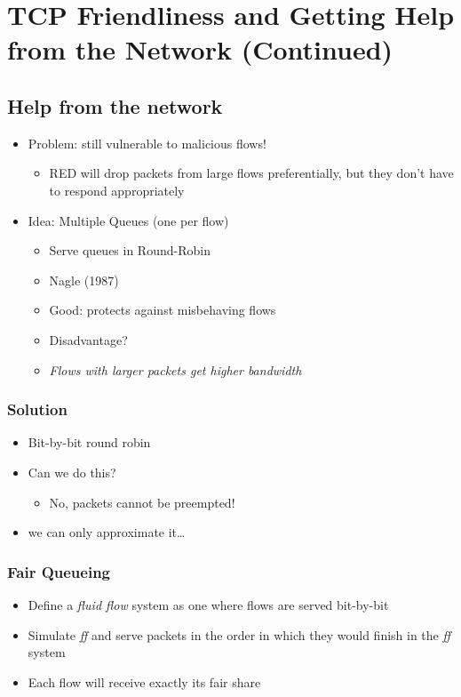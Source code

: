 \chapter{TCP Friendliness and Getting Help from the Network (Continued)}
\section{Help from the network}
\begin{itemize}[nosep]
    \item Problem: still vulnerable to malicious flows!
          \begin{itemize}[nosep]
              \item RED will drop packets from large flows preferentially, but they don't have to respond appropriately
          \end{itemize}
    \item Idea: Multiple Queues (one per flow)
          \begin{itemize}[nosep]
              \item Serve queues in Round-Robin
              \item Nagle (1987)
              \item Good: protects against misbehaving flows
              \item Disadvantage?
              \item \emph{Flows with larger packets get higher bandwidth}
          \end{itemize}
\end{itemize}
\subsection{Solution}
\begin{itemize}[nosep]
    \item Bit-by-bit round robin
    \item Can we do this?
          \begin{itemize}[nosep]
              \item No, packets cannot be preempted!
          \end{itemize}
    \item we can only approximate it\dots
\end{itemize}
\subsection{Fair Queueing}
\begin{itemize}[nosep]
    \item Define a \emph{fluid flow} system as one where flows are served bit-by-bit
    \item Simulate \emph{ff} and serve packets in the order in which they would finish in the \emph{ff} system
    \item Each flow will receive exactly its fair share
\end{itemize}
